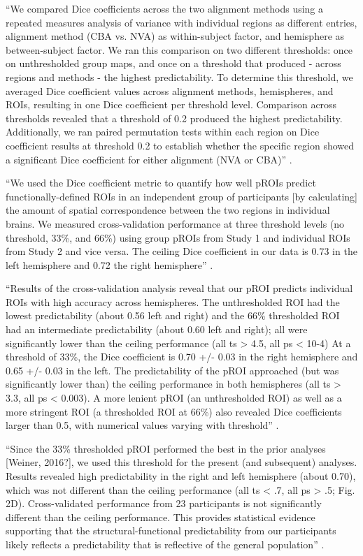 ``We compared Dice coefficients across the two alignment methods using a
repeated measures analysis of variance with individual regions as different
entries, alignment method (CBA vs. NVA) as within-subject factor, and hemisphere
as between-subject factor.
%
We ran this comparison on two different thresholds:
%
once on unthresholded group maps, and once on a threshold that produced - across
regions and methods - the highest predictability.
%
To determine this threshold, we averaged Dice coefficient values across
alignment methods, hemispheres, and ROIs, resulting in one Dice coefficient per
threshold level.
%
Comparison across thresholds revealed that a threshold of 0.2 produced the
highest predictability.
%
Additionally, we ran paired permutation tests within each region on Dice
coefficient results at threshold 0.2 to establish whether the specific region
showed a significant Dice coefficient for either alignment (NVA or CBA)''
\citep{rosenke2021probabilistic}.


``We used the Dice coefficient metric to quantify how well pROIs predict
functionally-defined ROIs in an independent group of participants [by
calculating] the amount of spatial correspondence between the two regions in
individual brains.
%
We measured cross-validation performance at three threshold levels (no
threshold, 33\%, and 66\%) using group pROIs from Study 1 and individual ROIs
from Study 2 and vice versa.
%
The ceiling Dice coefficient in our data is 0.73 in the left hemisphere and 0.72
the right hemisphere'' \citep{weiner2018defining}.

``Results of the cross-validation analysis reveal that our pROI predicts
individual ROIs with high accuracy across hemispheres.
%
The unthresholded ROI had the lowest predictability (about 0.56 left and right)
and the 66\% thresholded ROI had an intermediate predictability (about 0.60 left
and right); all were significantly lower than the ceiling performance (all ts >
4.5, all ps < 10-4)
%
At a threshold of 33\%, the Dice coefficient is 0.70 +/- 0.03 in the right
hemisphere and 0.65 +/- 0.03 in the left.
%
The predictability of the pROI approached (but was significantly lower than) the
ceiling performance in both hemispheres (all ts > 3.3, all ps < 0.003).
%
A more lenient pROI (an unthresholded ROI) as well as a more stringent ROI (a
thresholded ROI at 66\%) also revealed Dice coefficients larger than 0.5, with
numerical values varying with threshold'' \citep{weiner2018defining}.


``Since the 33\% thresholded pROI performed the best in the prior analyses
[Weiner, 2016?], we used this threshold for the present (and subsequent)
analyses.
%
Results revealed high predictability in the right and left hemisphere (about
0.70), which was not different than the ceiling performance (all ts < .7, all ps
> .5; Fig. 2D).
%
Cross-validated performance from 23 participants is not significantly different
than the ceiling performance.
%
This provides statistical evidence supporting that the structural-functional
predictability from our participants likely reflects a predictability that is
reflective of the general population'' \citep{weiner2018defining}.

